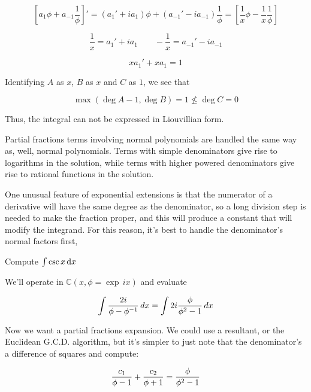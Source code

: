 $$\left[ a_1 \phi + a_{-1}\frac{1}{\phi} \right]' = (a_1' + i a_1 ) \phi + (a_{-1}' - i a_{-1} ) \frac{1}{\phi}
= \left[ \frac{1}{x}\phi - \frac{1}{x}\frac{1}{\phi} \right]$$

$$\frac{1}{x} = a_1' + i a_1 \qquad - \frac{1}{x} = a_{-1}' - i a_{-1}$$

$$x a_1' + x a_1 = 1$$

Identifying $A$ as $x$, $B$ as $x$ and $C$ as $1$, we see that
\begin{comment}
we've got a polynomial Risch equation with only one irreducible
factor for $A$: $F=x$.  Computing

$${\rm res}_x(m A F' - B, F) = {\rm res}_x(m + x, x) = m = 0$$

which has no positive integer solution for $m$.  Thus, $F$ can not
appear in $a_1$'s denominator, and $a_1$, if it exists at all, must be
a polynomial.
\end{comment}

$$\max(\deg A - 1, \deg B) = 1 \nleq \deg C = 0$$

Thus, the integral
can not be expressed in Liouvillian form.

\endexample

\vfil\eject

Partial fractions terms involving normal polynomials are handled the
same way as, well, normal polynomials.  Terms with simple denominators
give rise to logarithms in the solution, while terms with higher
powered denominators give rise to rational functions in the solution.

One unusual feature of exponential extensions is that the numerator of
a derivative will have the same degree as the denominator, so a long
division step is needed to make the fraction proper, and this will
produce a constant that will modify the integrand.  For this reason,
it's best to handle the denominator's normal factors first,


\example Compute $\int \csc x \, {\rm d}x$

We'll operate in ${\mathbb C}(x, \phi = \exp \,ix)$ and evaluate

$$\int {{2i}\over{\phi - \phi^{-1}}} \,dx = \int 2i {{\phi}\over{\phi^2 - 1}} \,dx$$

Now we want a partial fractions expansion.  We could use a resultant,
or the Euclidean G.C.D. algorithm, but it's simpler to just note that
the denominator's a difference of squares and compute:

$${{c_1}\over{\phi-1}} + {{c_2}\over{\phi+1}} = {{\phi}\over{\phi^2-1}} $$

